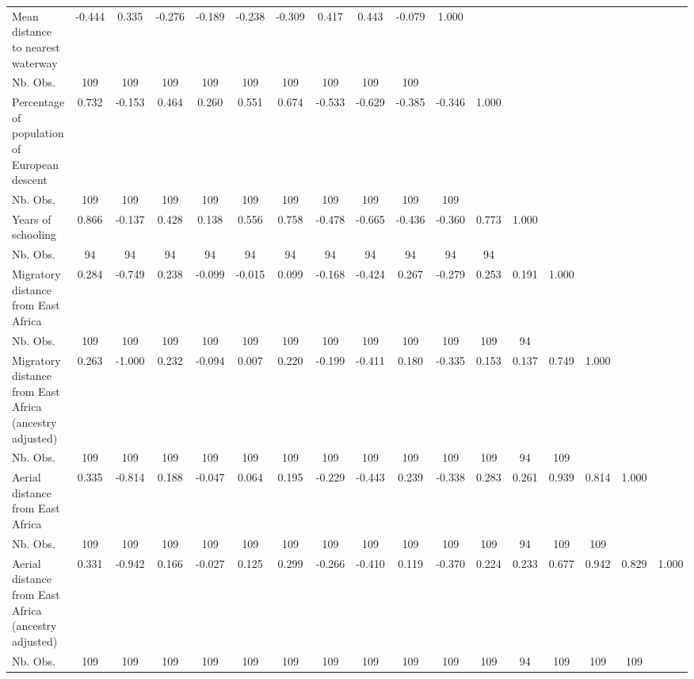 \begin{table}[htbp]
\begin{tabular}{l  c  c  c  c  c  c  c  c  c  c  c  c  c  c  c  c }
Mean distance to nearest waterway&-0.444&0.335&-0.276&-0.189&-0.238&-0.309&0.417&0.443&-0.079&1.000\\
Nb. Obs.&  109&  109&  109&  109&  109&  109&  109&  109&  109 &\\
Percentage of population of European descent&0.732&-0.153&0.464&0.260&0.551&0.674&-0.533&-0.629&-0.385&-0.346&1.000\\
Nb. Obs.&  109&  109&  109&  109&  109&  109&  109&  109&  109&  109 &\\
Years of schooling&0.866&-0.137&0.428&0.138&0.556&0.758&-0.478&-0.665&-0.436&-0.360&0.773&1.000\\
Nb. Obs.&   94&   94&   94&   94&   94&   94&   94&   94&   94&   94&   94 &\\
Migratory distance from East Africa&0.284&-0.749&0.238&-0.099&-0.015&0.099&-0.168&-0.424&0.267&-0.279&0.253&0.191&1.000\\
Nb. Obs.&  109&  109&  109&  109&  109&  109&  109&  109&  109&  109&  109&   94 &\\
Migratory distance from East Africa (ancestry adjusted)&0.263&-1.000&0.232&-0.094&0.007&0.220&-0.199&-0.411&0.180&-0.335&0.153&0.137&0.749&1.000\\
Nb. Obs.&  109&  109&  109&  109&  109&  109&  109&  109&  109&  109&  109&   94&  109 &\\
Aerial distance from East Africa&0.335&-0.814&0.188&-0.047&0.064&0.195&-0.229&-0.443&0.239&-0.338&0.283&0.261&0.939&0.814&1.000\\
Nb. Obs.&  109&  109&  109&  109&  109&  109&  109&  109&  109&  109&  109&   94&  109&  109 &\\
Aerial distance from East Africa (ancestry adjusted)&0.331&-0.942&0.166&-0.027&0.125&0.299&-0.266&-0.410&0.119&-0.370&0.224&0.233&0.677&0.942&0.829&1.000\\
Nb. Obs.&  109&  109&  109&  109&  109&  109&  109&  109&  109&  109&  109&   94&  109&  109&  109\\
\hline \hline 
 \end{tabular}
\end{table}
